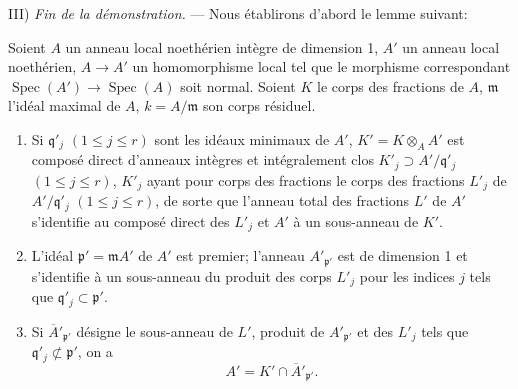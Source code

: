 III) \emph{Fin de la démonstration.} --- Nous établirons d'abord le lemme
suivant:

\begin{lemma}[6.14.1.2]
\label{IV.2.s6.14.1.2-fr}
Soient $A$ un anneau local noethérien intègre de dimension 1, $A'$ un
anneau local noethérien, $A\to A'$ un homomorphisme local tel que le
morphisme correspondant $\operatorname{Spec}(A')\to\operatorname{Spec}(A)$
soit normal. Soient $K$ le corps des fractions de $A$, $\mathfrak m$
l'idéal maximal de $A$, $k=A/\mathfrak m$ son corps résiduel.
\begin{enumerate}
\item[\textup{(i)}] Si $\mathfrak q'_j$ $(1\leqslant j\leqslant r)$ sont les idéaux
minimaux de $A'$, $K'=K\otimes_A A'$ est composé direct d'anneaux intègres
et intégralement clos $K'_j\supset A'/\mathfrak q'_j$
$(1\leqslant j\leqslant r)$, $K'_j$ ayant pour corps des fractions le corps
des fractions $L'_j$ de $A'/\mathfrak q'_j$ $(1\leqslant j\leqslant r)$, de sorte que l'anneau total des
fractions $L'$ de $A'$ s'identifie au composé direct des $L'_j$ et $A'$ à
un sous-anneau de $K'$.
\item[\textup{(ii)}] L'idéal $\mathfrak p'=\mathfrak mA'$ de $A'$ est premier;
l'anneau $A'_{\mathfrak p'}$ est de dimension 1 et s'identifie à un
sous-anneau du produit des corps $L'_j$ pour les indices $j$ tels que
$\mathfrak q'_j\subset\mathfrak p'$.
\item[\textup{(iii)}] Si $\overline{A}'_{\mathfrak p'}$ désigne le sous-anneau de
$L'$, produit de $A'_{\mathfrak p'}$ et des $L'_j$ tels que
$\mathfrak q'_j\not\subset\mathfrak p'$, on a
\begin{equation}
\tag{6.14.1.3}
\label{IV.2.s6.14.1.3-fr}
A'=K'\cap\overline{A}'_{\mathfrak p'}.
\end{equation}
\end{enumerate}
\end{lemma}

